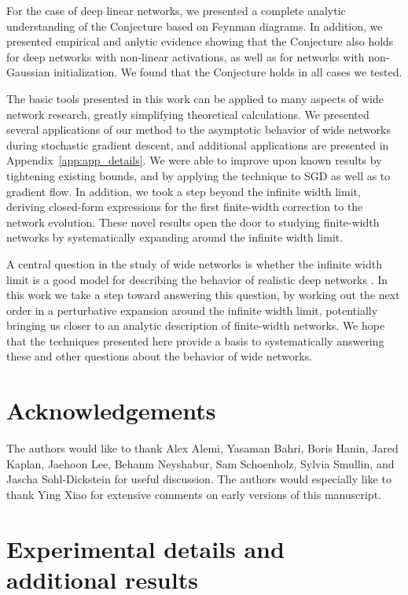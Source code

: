 \documentclass[english]{article}
\newcommand{\pcite}[1]{\cite{#1}}
\begin{document}
For the case of deep linear networks, we presented a complete analytic understanding of the Conjecture based on Feynman diagrams.
In addition, we presented empirical and anlytic evidence showing that the Conjecture also holds for deep networks with non-linear activations, as well as for networks with non-Gaussian initialization.
We found that the Conjecture holds in all cases we tested.

The basic tools presented in this work can be applied to many aspects of wide network research, greatly simplifying theoretical calculations.
We presented several applications of our method to the asymptotic behavior of wide networks during stochastic gradient descent, and additional applications are presented in Appendix~\ref{app:app_details}.
We were able to improve upon known results by tightening existing bounds, and by applying the technique to SGD as well as to gradient flow.
In addition, we took a step beyond the infinite width limit, deriving closed-form expressions for the first finite-width correction to the network evolution.
These novel results open the door to studying finite-width networks by systematically expanding around the infinite width limit.

A central question in the study of wide networks is whether the infinite width limit is a good model for describing the behavior of realistic deep networks \pcite{2018arXiv181207956C,2019arXiv190608899G,DBLP:journals/corr/abs-1906-08034}.
In this work we take a step toward answering this question, by working out the next order in a perturbative expansion around the infinite width limit, potentially bringing us closer to an analytic description of finite-width networks.
We hope that the techniques presented here provide a basis to systematically answering these and other questions about the behavior of wide networks. 

\section*{Acknowledgements}

The authors would like to thank
Alex Alemi,
Yasaman Bahri,
Boris Hanin,
Jared Kaplan,
Jaehoon Lee,
Behanm Neyshabur,
Sam Schoenholz,
Sylvia Smullin,
and
Jascha Sohl-Dickstein
for useful discussion.
The authors would especially like to thank Ying Xiao for extensive comments on early versions of this manuscript.

\appendix

\section{Experimental details and additional results}\label{app:expDetails}
\end{document}
